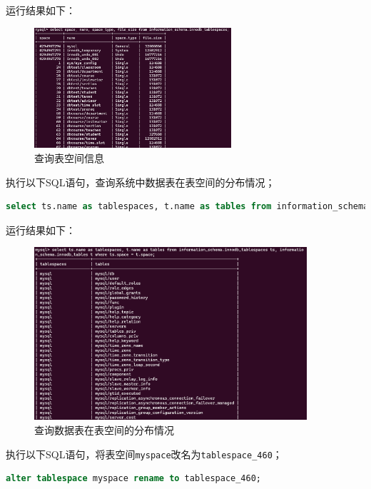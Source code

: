 \documentclass{article}
\renewcommand\tt{\texttt}
\begin{document}
运行结果如下：

\begin{figure}[H]
\centering
\includegraphics[width=0.65\textwidth]{img/4.png}
\caption{查询表空间信息}
\end{figure}

执行以下SQL语句，查询系统中数据表在表空间的分布情况；

\begin{lstlisting}[language=sql]
select ts.name as tablespaces, t.name as tables from information_schema.innodb_tablespaces ts, information_schema.innodb_tables t where ts.space = t.space;
\end{lstlisting}

运行结果如下：

\begin{figure}[H]
\centering
\includegraphics[width=0.9\textwidth]{img/5.png}
\caption{查询数据表在表空间的分布情况}
\end{figure}

执行以下SQL语句，将表空间\tt{myspace}改名为\tt{tablespace\_460}；

\begin{lstlisting}[language=sql]
alter tablespace myspace rename to tablespace_460;
\end{lstlisting}
\end{document}
